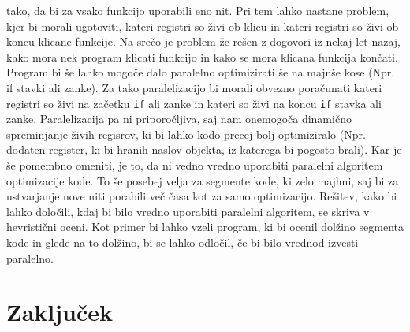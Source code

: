 \documentclass[a4paper, 12pt]{book}
\begin{document}
tako, da bi za vsako funkcijo uporabili eno nit. Pri tem lahko nastane problem, kjer bi morali ugotoviti, kateri registri so živi ob klicu in kateri registri so živi ob koncu klicane funkcije. Na srečo je problem že rešen z dogovori iz nekaj let nazaj, kako mora nek program klicati funkcijo in kako se mora klicana funkcija končati. Program bi še lahko mogoče dalo paralelno optimizirati še na majnše kose (Npr. if stavki ali zanke). Za tako paralelizacijo bi morali obvezno poračunati kateri registri so živi na začetku \texttt{if} ali zanke in kateri so živi na koncu \texttt{if} stavka ali zanke. Paralelizacija pa ni priporočljiva, saj nam onemogoča dinamično spreminjanje živih regisrov, ki bi lahko kodo precej bolj optimiziralo (Npr. dodaten register, ki bi hranih naslov objekta, iz katerega bi pogosto brali). Kar je še pomembno omeniti, je to, da ni vedno vredno uporabiti paralelni algoritem optimizacije kode. To še posebej velja za segmente kode, ki zelo majhni, saj bi za ustvarjanje nove niti porabili več časa kot za samo optimizacijo. Rešitev, kako bi lahko določili, kdaj bi bilo vredno uporabiti paralelni algoritem, se skriva v hevristični oceni. Kot primer bi lahko vzeli program, ki bi ocenil dolžino segmenta kode in glede na to dolžino, bi se lahko odločil, če bi bilo vrednod izvesti paralelno.

\chapter{Zaključek}
\end{document}
